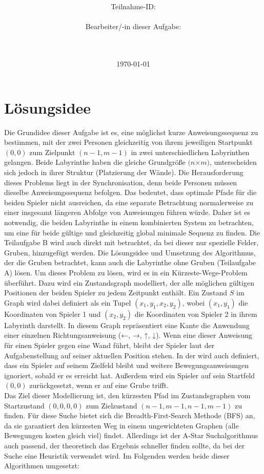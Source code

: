 \documentclass[a4paper,10pt,ngerman]{scrartcl}
\title{\textbf{\Huge\Aufgabe}}
\author{\LARGE Teilnahme-ID: \LARGE \TeilnahmeId \\\\
	    \LARGE Bearbeiter/-in dieser Aufgabe: \\ 
	    \LARGE \Name\\\\}
\date{\LARGE\today}
\begin{document}
\maketitle
\tableofcontents

\vspace{0.5cm}

\section{Lösungsidee}
Die Grundidee dieser Aufgabe ist es, eine möglichst kurze Anweisungssequenz zu bestimmen, mit der zwei Personen gleichzeitig von ihrem jeweiligen Startpunkt $(0,0)$ zum Zielpunkt $(n-1,m-1)$ in zwei unterschiedlichen Labyrinthen gelangen. Beide Labyrinthe haben die gleiche Grundgröße $(n$×$m)$, unter\-scheiden sich jedoch in ihrer Struktur (Platzierung der Wände). Die Herausforderung dieses Problems liegt in der Synchronisation, denn beide Personen müssen dieselbe Anweisungssequenz befolgen. Das bedeutet, dass optimale Pfade für die beiden Spieler nicht ausreichen, da eine separate Betrachtung normalerweise zu einer insgesamt längeren Abfolge von Anweisungen führen würde. Daher ist es notwendig, die beiden Labyrinthe in einem kombinierten System zu betrachten, um eine für beide gültige und gleichzeitig global minimale Sequenz zu finden. Die Teilaufgabe B wird auch direkt mit betrachtet, da bei dieser nur spezielle Felder, Gruben, hinzugefügt werden. Die Lösungsidee und Umsetzung des Algorithmus, der die Gruben betrachtet, kann auch die Labyrinthe ohne Gruben (Teilaufgabe A) lösen. 
\newline
\indent \indent Um dieses Problem zu lösen, wird es in ein Kürzeste-Wege-Problem überführt. Dazu wird ein Zustandsgraph modelliert, der alle möglichen gültigen Positionen der beiden Spieler zu jedem Zeitpunkt enthält. Ein Zustand $S$ im Graph wird dabei definiert als ein Tupel $(x_1, y_1, x_2, y_2)$, wobei $(x_1, y_1)$ die Koordinaten von Spieler 1 und $(x_2, y_2)$ die Koordinaten von Spieler 2 in ihrem Labyrinth darstellt. In diesem Graph repräsentiert eine Kante die Anwendung einer einzelnen Richtungsanweisung (←, →, ↑, ↓). Wenn eine dieser Anweisung für einen Spieler gegen eine Wand führt, bleibt der Spieler laut der Aufgabenstellung auf seiner aktuellen Position stehen. In der wird auch definiert, dass ein Spieler auf seinem Zielfeld bleibt und weitere Bewegungsanweisungen ignoriert, sobald er es erreicht hat. Außerdem wird ein Spieler auf sein Startfeld $(0,0)$ zurückgesetzt, wenn er auf eine Grube trifft. 
\\\newline
Das Ziel dieser Modellierung ist, den kürzesten Pfad im Zustandsgraphen vom Startzustand $(0, 0, 0, 0)$ zum Zielzustand $(n-1, m-1, n-1, m-1)$ zu finden. Für diese Suche bietet sich die Breadth-First-Search Methode (BFS) an, da sie garantiert den kürzesten Weg in einem ungewichteten Graphen (alle Bewegungen kosten gleich viel) findet. Allerdings ist der A-Star Suchalgorithmus auch passend, der theoretisch das Ergebnis schneller finden sollte, da bei der Suche eine Heuristik verwendet wird. Im Folgenden werden beide dieser Algorithmen umgesetzt:
\end{document}
